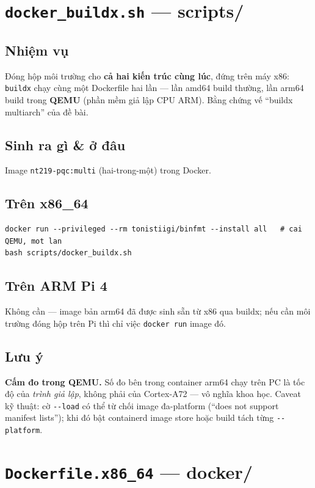 \documentclass[11pt,a4paper]{article}
\begin{document}
\section{\texttt{docker\_buildx.sh} — \textmd{\normalsize scripts/}}

\subsection*{Nhiệm vụ}
Đóng hộp môi trường cho \textbf{cả hai kiến trúc cùng lúc}, đứng trên máy x86: \verb|buildx| chạy cùng một Dockerfile hai lần — lần amd64 build thường, lần arm64 build trong \textbf{QEMU} (phần mềm giả lập CPU ARM). Bằng chứng vế ``buildx multiarch'' của đề bài.

\subsection*{Sinh ra gì \& ở đâu}
Image \verb|nt219-pqc:multi| (hai-trong-một) trong Docker.

\subsection*{Trên x86\_64}
\begin{lstlisting}
docker run --privileged --rm tonistiigi/binfmt --install all   # cai QEMU, mot lan
bash scripts/docker_buildx.sh
\end{lstlisting}

\subsection*{Trên ARM Pi 4}
Không cần — image bản arm64 đã được sinh sẵn từ x86 qua buildx; nếu cần môi trường đóng hộp trên Pi thì chỉ việc \verb|docker run| image đó.

\subsection*{Lưu ý}
\textbf{Cấm đo trong QEMU.} Số đo bên trong container arm64 chạy trên PC là tốc độ của \emph{trình giả lập}, không phải của Cortex-A72 — vô nghĩa khoa học. Caveat kỹ thuật: cờ \verb|--load| có thể từ chối image đa-platform (``does not support manifest lists''); khi đó bật containerd image store hoặc build tách từng \verb|--platform|.

\section{\texttt{Dockerfile.x86\_64} — \textmd{\normalsize docker/}}
\end{document}
